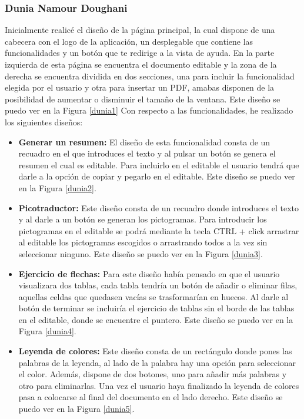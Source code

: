 \subsubsection{Dunia Namour Doughani}
Inicialmente realicé el diseño de la página principal, la cual dispone de una cabecera con el logo de la aplicación, un desplegable que contiene las funcionalidades y un botón que te redirige a la vista de ayuda. En la parte izquierda de esta página se encuentra el documento editable y la zona de la derecha se encuentra dividida en dos secciones, una para incluir la funcionalidad elegida por el usuario y otra para insertar un PDF, amabas disponen de la posibilidad de aumentar o disminuir el tamaño de la ventana. Este diseño se puedo ver en la Figura \ref{dunia1} Con respecto a las funcionalidades, he realizado los siguientes diseños:
\begin{itemize}
  \item \textbf{Generar un resumen:} El diseño de esta funcionalidad consta de un recuadro en el que introduces el texto y al pulsar un botón se genera el resumen el cual es editable. Para incluirlo en el editable el usuario tendrá que darle a la opción de copiar y pegarlo en el editable. Este diseño se puedo ver en la Figura \ref{dunia2}. 
  \item \textbf{Picotraductor:} Este diseño consta de un recuadro donde introduces el texto y al darle a un botón se generan los pictogramas. Para introducir los pictogramas en el editable se podrá mediante la tecla CTRL + click arrastrar al editable los pictogramas escogidos o arrastrando todos a la vez sin seleccionar ninguno. Este diseño se puedo ver en la Figura \ref{dunia3}.
  \item \textbf{Ejercicio de flechas:} Para este diseño había pensado en que el usuario visualizara dos tablas, cada tabla tendría un botón de añadir o eliminar filas, aquellas celdas que quedasen vacías se trasformarían en huecos. Al darle al botón de terminar se incluiría el ejercicio de tablas sin el borde de las tablas en el editable, donde se encuentre el puntero. Este diseño se puedo ver en la Figura \ref{dunia4}.
  \item  \textbf{Leyenda de colores:} Este diseño consta de un rectángulo donde pones las palabras de la leyenda, al lado de la palabra hay una opción para seleccionar el color. Además, dispone de dos botones, uno para añadir más palabras y otro para eliminarlas. Una vez el usuario haya finalizado la leyenda de colores pasa a colocarse al final del documento en el lado derecho. Este diseño se puedo ver en la Figura \ref{dunia5}.

\end{itemize}
